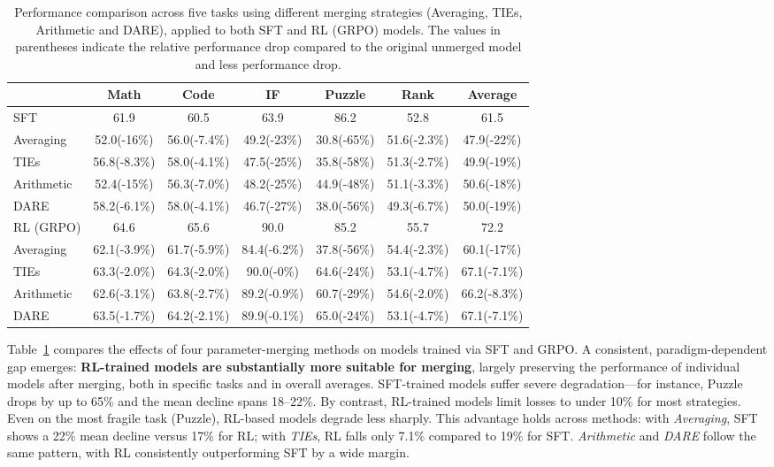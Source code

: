 \documentclass{article} %
\begin{document}
\begin{table}[t]
\centering
\footnotesize
\renewcommand{\arraystretch}{1.2} 
\begin{tabular}{lcccccc}
\hline
                & \textbf{Math}         & \textbf{Code}         & \textbf{IF}          & \textbf{Puzzle}        & \textbf{Rank}         & \textbf{Average}  \\ \hline
SFT             & 61.9         & 60.5         & 63.9        & 86.2          & 52.8         & 61.5 \\
Averaging       & 52.0(-16\%)  & 56.0(-7.4\%) & 49.2(-23\%) & 30.8(-65\%)   & 51.6(-2.3\%) & 47.9(-22\%) \\
TIEs            & 56.8(-8.3\%) & 58.0(-4.1\%) & 47.5(-25\%) & 35.8(-58\%)   & 51.3(-2.7\%) & 49.9(-19\%) \\
Arithmetic      & 52.4(-15\%)  & 56.3(-7.0\%) & 48.2(-25\%) & 44.9(-48\%)   & 51.1(-3.3\%) & 50.6(-18\%) \\ 
DARE            & 58.2(-6.1\%) & 58.0(-4.1\%) & 46.7(-27\%) & 38.0(-56\%)   & 49.3(-6.7\%) & 50.0(-19\%) \\\hline
RL (GRPO)             & 64.6         & 65.6         & 90.0         & 85.2          & 55.7         & 72.2 \\
Averaging       & 62.1(-3.9\%) & 61.7(-5.9\%) & 84.4(-6.2\%) & 37.8(-56\%)   & 54.4(-2.3\%) & 60.1(-17\%) \\
TIEs            & 63.3(-2.0\%) & 64.3(-2.0\%) & 90.0(-0\%)   & 64.6(-24\%)   & 53.1(-4.7\%) & 67.1(-7.1\%) \\ 
Arithmetic      & 62.6(-3.1\%) & 63.8(-2.7\%) & 89.2(-0.9\%) & 60.7(-29\%)   & 54.6(-2.0\%) & 66.2(-8.3\%) \\ 
DARE            & 63.5(-1.7\%) & 64.2(-2.1\%) & 89.9(-0.1\%) & 65.0(-24\%)   & 53.1(-4.7\%) & 67.1(-7.1\%) \\ \hline
\end{tabular}

\caption{Performance comparison across five tasks using different merging strategies (Averaging,  TIEs, Arithmetic and DARE), applied to both SFT and RL (GRPO) models. The values in parentheses indicate the relative performance drop compared to the original unmerged model and less performance drop.}
\label{table:main}
\end{table}

Table~\ref{table:main} compares the effects of four parameter-merging methods on models trained via SFT and GRPO. A consistent, paradigm-dependent gap emerges: \textbf{RL-trained models are substantially more suitable for merging}, largely preserving the performance of individual models after merging, both in specific tasks and in overall averages. SFT-trained models suffer severe degradation—for instance, Puzzle drops by up to 65\% and the mean decline spans 18–22\%. By contrast, RL-trained models limit losses to under 10\% for most strategies. Even on the most fragile task (Puzzle), RL-based models degrade less sharply. This advantage holds across methods: with \emph{Averaging}, SFT shows a 22\% mean decline versus 17\% for RL; with \emph{TIEs}, RL falls only 7.1\% compared to 19\% for SFT. \emph{Arithmetic} and \emph{DARE} follow the same pattern, with RL consistently outperforming SFT by a wide margin.
\end{document}
